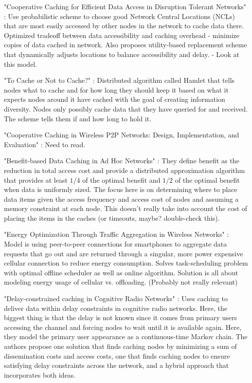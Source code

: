 "Cooperative Caching for Efficient Data Access in Disruption Tolerant Networks" \cite{coop_cache_gao2014}:  Use probabilistic scheme to choose good Network Central Locations (NCLs) that are most easily accessed by other nodes in the network to cache data there.  Optimized tradeoff between data accessibility and caching overhead - minimize copies of data cached in network.  Also proposes utility-based replacement scheme that dynamically adjusts locations to balance accessibility and delay. - Look at this model.

"To Cache or Not to Cache?" \cite{cache_or_not}:  Distributed algorithm called Hamlet that tells nodes what to cache and for how long they should keep it based on what it expects nodes around it have cached with the goal of creating information diversity.  Nodes only possibly cache data that they have queried for and received.  The scheme tells them if and how long to hold it.  

"Cooperative Caching in Wireless P2P Networks:  Design, Implementation, and Evaluation" \cite{coop_cache_p2p_nets} : Need to read.

"Benefit-based Data Caching in Ad Hoc Networks" \cite{benefit_based_cache}:  They define benefit as the reduction in total access cost and provide a distributed approximation algorithm that provides at least $1/4$ of the optimal benefit and $1/2$ of the optimal benefit when data is uniformly sized.  The focus here is on determining where to place data items given the access frequency and access cost of nodes and assuming a memory constraint at each node.  This doesn't really take into account the cost of placing the items in the caches (or timeouts, maybe?  double-check this).

"Energy Optimization Through Traffic Aggregation in Wireless Networks" \cite{traffic_agg_infocom2014}:  Model is using peer-to-peer connections for smartphones to aggregate data requests that go out and are returned through a singular, more power expensive cellular connection to reduce energy consumption.  Solves task-scheduling problem with optimal offline scheduler as well as online algorithm.  Solution is all about modeling energy usage of cellular vs. offloading.  (Probably not really relevant)

"Delay-constrained caching in Cognitive Radio Networks" \cite{cache_cog_nets_infocom2014}:  Uses caching to deliver data within delay constraints in cognitive radio networks.  Here, the biggest thing is that the delay is not known since it comes from primary users accessing the channel and forcing nodes to wait until it is available again.  Here, they model the primary user appearance as a continuous-time Markov chain.  The authors propose one solution that finds caching nodes by minimizing a sum of dissemination costs and access costs, one that finds caching nodes to ensure satisfying delay constraints across the network, and a hybrid approach that incorporates both ideas.

